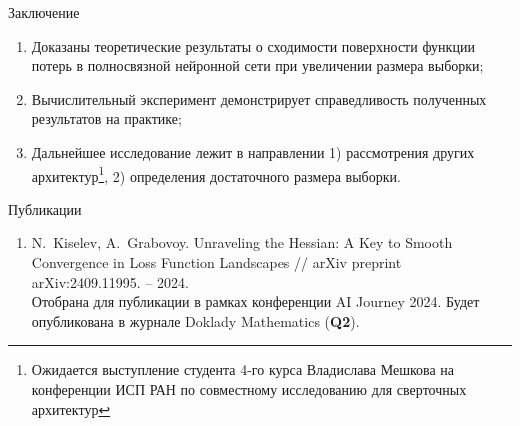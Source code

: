 \documentclass[aspectratio=169]{beamer}
\begin{document}
\begin{frame}{Заключение}
    \begin{enumerate}
        \item Доказаны теоретические результаты о сходимости поверхности функции потерь в полносвязной нейронной сети при увеличении размера выборки;
        \item Вычислительный эксперимент демонстрирует справедливость полученных результатов на практике;
        \item Дальнейшее исследование лежит в направлении 1) рассмотрения других архитектур\footnote{Ожидается выступление студента 4-го курса Владислава Мешкова на конференции ИСП РАН по совместному исследованию для сверточных архитектур}, 2) определения достаточного размера выборки.
    \end{enumerate}
    \begin{block}{Публикации}
        \begin{enumerate}
            \item N.~Kiselev, A.~Grabovoy. Unraveling the Hessian: A Key to Smooth Convergence in Loss Function Landscapes // arXiv preprint arXiv:2409.11995. – 2024.\\
            Отобрана для публикации в рамках конференции AI Journey 2024. Будет опубликована в журнале Doklady Mathematics (\textbf{Q2}).
        \end{enumerate}
    \end{block}
    \vspace{0.5em}
\end{frame}
\end{document}
